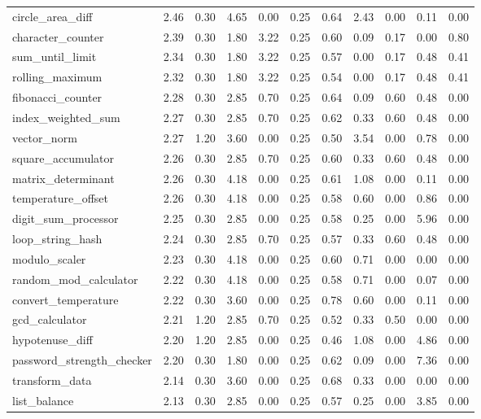 \begin{table}[h]
\begin{adjustbox}{max width=\textwidth}
\begin{tabular}{lrrrrrrrrrr}
circle\_area\_diff & 2.46 & 0.30 & 4.65 & 0.00 & 0.25 & 0.64 & 2.43 & 0.00 & 0.11 & 0.00 \\
character\_counter & 2.39 & 0.30 & 1.80 & 3.22 & 0.25 & 0.60 & 0.09 & 0.17 & 0.00 & 0.80 \\
sum\_until\_limit & 2.34 & 0.30 & 1.80 & 3.22 & 0.25 & 0.57 & 0.00 & 0.17 & 0.48 & 0.41 \\
rolling\_maximum & 2.32 & 0.30 & 1.80 & 3.22 & 0.25 & 0.54 & 0.00 & 0.17 & 0.48 & 0.41 \\
fibonacci\_counter & 2.28 & 0.30 & 2.85 & 0.70 & 0.25 & 0.64 & 0.09 & 0.60 & 0.48 & 0.00 \\
index\_weighted\_sum & 2.27 & 0.30 & 2.85 & 0.70 & 0.25 & 0.62 & 0.33 & 0.60 & 0.48 & 0.00 \\
vector\_norm & 2.27 & 1.20 & 3.60 & 0.00 & 0.25 & 0.50 & 3.54 & 0.00 & 0.78 & 0.00 \\
square\_accumulator & 2.26 & 0.30 & 2.85 & 0.70 & 0.25 & 0.60 & 0.33 & 0.60 & 0.48 & 0.00 \\
matrix\_determinant & 2.26 & 0.30 & 4.18 & 0.00 & 0.25 & 0.61 & 1.08 & 0.00 & 0.11 & 0.00 \\
temperature\_offset & 2.26 & 0.30 & 4.18 & 0.00 & 0.25 & 0.58 & 0.60 & 0.00 & 0.86 & 0.00 \\
digit\_sum\_processor & 2.25 & 0.30 & 2.85 & 0.00 & 0.25 & 0.58 & 0.25 & 0.00 & 5.96 & 0.00 \\
loop\_string\_hash & 2.24 & 0.30 & 2.85 & 0.70 & 0.25 & 0.57 & 0.33 & 0.60 & 0.48 & 0.00 \\
modulo\_scaler & 2.23 & 0.30 & 4.18 & 0.00 & 0.25 & 0.60 & 0.71 & 0.00 & 0.00 & 0.00 \\
random\_mod\_calculator & 2.22 & 0.30 & 4.18 & 0.00 & 0.25 & 0.58 & 0.71 & 0.00 & 0.07 & 0.00 \\
convert\_temperature & 2.22 & 0.30 & 3.60 & 0.00 & 0.25 & 0.78 & 0.60 & 0.00 & 0.11 & 0.00 \\
gcd\_calculator & 2.21 & 1.20 & 2.85 & 0.70 & 0.25 & 0.52 & 0.33 & 0.50 & 0.00 & 0.00 \\
hypotenuse\_diff & 2.20 & 1.20 & 2.85 & 0.00 & 0.25 & 0.46 & 1.08 & 0.00 & 4.86 & 0.00 \\
password\_strength\_checker & 2.20 & 0.30 & 1.80 & 0.00 & 0.25 & 0.62 & 0.09 & 0.00 & 7.36 & 0.00 \\
transform\_data & 2.14 & 0.30 & 3.60 & 0.00 & 0.25 & 0.68 & 0.33 & 0.00 & 0.00 & 0.00 \\
list\_balance & 2.13 & 0.30 & 2.85 & 0.00 & 0.25 & 0.57 & 0.25 & 0.00 & 3.85 & 0.00 \\

\end{tabular}
\end{adjustbox}
\end{table}
